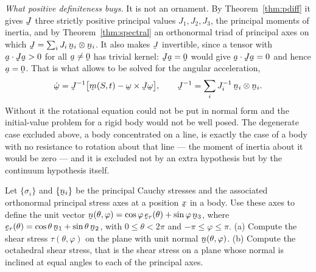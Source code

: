 \begin{solution}
\medskip
\noindent\emph{What positive definiteness buys.}
It is not an ornament. By Theorem~\ref{thm:pdiff} it gives $\vek{J}$
three strictly positive principal values $J_{1},J_{2},J_{3}$, the
principal moments of inertia, and by Theorem~\ref{thm:spectral} an
orthonormal triad of principal axes on which
$\vek{J}=\sum_{i}J_{i}\,\bn_{i}\otimes\bn_{i}$. It also makes $\vek{J}$
invertible, since a tensor with $\ip\ba{\vek{J}\ba}>0$ for all
$\ba\neq\bze$ has trivial kernel: $\vek{J}\ba=\bze$ would give
$\ip\ba{\vek{J}\ba}=0$ and hence $\ba=\bze$. That is what allows
 to be solved for the angular acceleration,
\[
   \dot\bom=\vek{J}^{-1}\big[\bm(S,t)-\bom\times\vek{J}\bom\big] ,
   \qquad
   \vek{J}^{-1}=\sum_{i}J_{i}^{-1}\,\bn_{i}\otimes\bn_{i} .
\]
Without it the rotational equation could not be put in normal form and
the initial-value problem for a rigid body would not be well posed. The
degenerate case excluded above, a body concentrated on a line, is
exactly the case of a body with no resistance to rotation about that
line --- the moment of inertia about it would be zero --- and it is
excluded not by an extra hypothesis but by the continuum hypothesis
itself.
\end{solution}

\begin{problem}
Let $\{\sigma_{i}\}$ and $\{\bn_{i}\}$ be the principal Cauchy stresses
and the associated orthonormal principal stress axes at a position
$\bx$ in a body. Use these axes to define the unit vector
$\bn(\theta,\varphi)=\cos\varphi\,\ber(\theta)+\sin\varphi\,\bn_{3}$,
where $\ber(\theta)=\cos\theta\,\bn_{1}+\sin\theta\,\bn_{2}$, with
$0\leq\theta<2\pi$ and $-\pi\leq\varphi\leq\pi$.
\textup{(a)} Compute the shear stress $\tau(\theta,\varphi)$ on the
plane with unit normal $\bn(\theta,\varphi)$.
\textup{(b)} Compute the octahedral shear stress, that is the shear
stress on a plane whose normal is inclined at equal angles to each of
the principal axes.
\end{problem}

